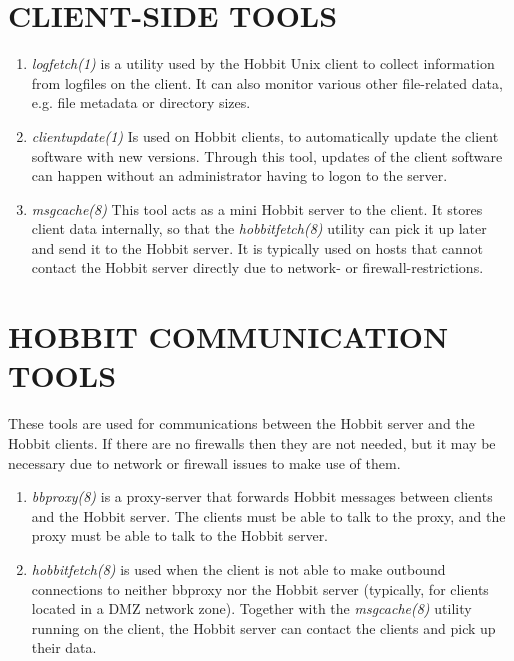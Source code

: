 \section{CLIENT-SIDE TOOLS}
\begin{enumerate}

 \item \emph{logfetch(1)}
 is a utility used by the Hobbit Unix client to collect information
 from logfiles on the client. It can also monitor various other
 file-related data, e.g. file metadata or directory sizes. 

 \item \emph{clientupdate(1)}
 Is used on Hobbit clients, to automatically update the client
 software with new versions. Through this tool, updates of the client
 software can happen without an administrator having to logon to the
 server. 

 \item \emph{msgcache(8)}
 This tool acts as a mini Hobbit server to the client. It stores
 client data internally, so that the \emph{hobbitfetch(8)} utility can
 pick it up later and send it to the Hobbit server. It is typically
 used on hosts that cannot contact the Hobbit server directly due to
 network- or firewall-restrictions. 

\end{enumerate}

\section{HOBBIT COMMUNICATION TOOLS}

 These tools are used for communications between the Hobbit server and
 the Hobbit clients. If there are no firewalls then they are not
 needed, but it may be necessary due to network or firewall issues to
 make use of them. 

\begin{enumerate}
\item \emph{bbproxy(8)}
 is a proxy-server that forwards Hobbit messages between clients and
 the Hobbit server. The clients must be able to talk to the proxy, and
 the proxy must be able to talk to the Hobbit server. 



\item \emph{hobbitfetch(8)}
 is used when the client is not able to make outbound connections to
 neither bbproxy nor the Hobbit server (typically, for clients located
 in a DMZ network zone). Together with the \emph{msgcache(8)} utility
 running on the client, the Hobbit server can contact the clients and
 pick up their data. 

\end{enumerate}
 
